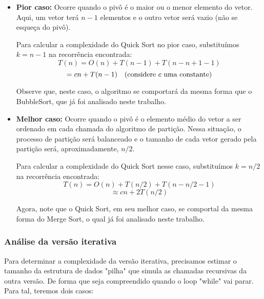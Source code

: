\begin{itemize}
	\item \textbf{Pior caso:} Ocorre quando o pivô é o maior ou o menor elemento do vetor. Aqui, um vetor terá \( n-1 \) elementos e o outro vetor será vazio (não se esqueça do pivô).

	      Para calcular a complexidade do Quick Sort no pior caso, substituímos \( k = n - 1 \) na recorrência encontrada:
	      \[
		      T(n) = O(n) + T(n-1) + T(n - n + 1 - 1)
	      \]
	      \[
		      = cn + T(n-1) \quad \text{(considere \( c \) uma constante)}
	      \]

	      Observe que, neste caso, o algoritmo se comportará da mesma forma que o BubbleSort, que já foi analisado neste trabalho.

	\item \textbf{Melhor caso:} Ocorre quando o pivô é o elemento médio do vetor a ser ordenado em cada chamada do algoritmo de partição. Nessa situação, o processo de partição será balanceado e o tamanho de cada vetor gerado pela partição será, aproximadamente, \( n/2 \).

	      Para calcular a complexidade do Quick Sort nesse caso, substituímos \( k = n/2 \) na recorrência encontrada:
	      \[
		      T(n) = O(n) + T(n/2) + T(n - n/2 - 1)
	      \]
	      \[
		      \approx cn + 2T(n/2)
	      \]

	      Agora, note que o Quick Sort, em seu melhor caso, se comportal da mesma forma do Merge Sort, o qual já foi analisado neste trabalho.

\end{itemize}

\subsubsection{Análise da versão iterativa}

Para determinar a complexidade da versão iterativa, precisamos estimar o tamanho da estrutura de dados "pilha" que simula as chamadas recursivas da outra versão. De forma que seja compreendido quando o loop "while" vai parar. Para tal, teremos dois casos:

